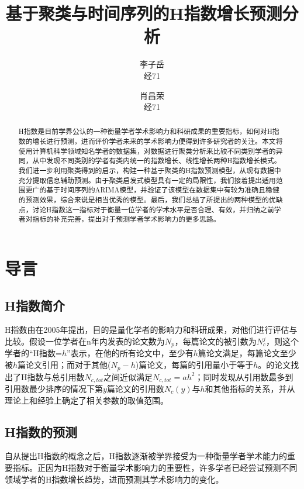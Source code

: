 \documentclass[lang=cn,11pt,a4paper,cite=authoryear]{elegantpaper}
\title{基于聚类与时间序列的H指数增长预测分析}
\author{李子岳 \\ 经71  \and 肖昌荣 \\ 经71}
\institute{清华大学经济管理学院}
\date{\zhtoday}
\begin{document}
\maketitle

\begin{abstract}
H指数是目前学界公认的一种衡量学者学术影响力和科研成果的重要指标，如何对H指数的增长进行预测，进而评价学者未来的学术影响力便得到许多研究者的关注。本文将使用计算机科学领域知名学者的数据集，对数据进行聚类分析来比较不同类别学者的异同，从中发现不同类别的学者有类内统一的指数增长、线性增长两种H指数增长模式。我们进一步利用聚类得到的启示，构建一种基于聚类的H指数预测模型，从现有数据中充分提取信息辅助预测。由于聚类启发式模型具有一定的局限性，我们接着提出适用范围更广的基于时间序列的ARIMA模型，并验证了该模型在数据集中有较为准确且稳健的预测效果，综合来说是相当优秀的模型。最后，我们总结了所提出的两种模型的优缺点，讨论H指数这一指标对于衡量一位学者的学术水平是否合理、有效，并归纳之前学者对指标的补充完善，提出对于预测学者学术影响力的更多思路。
\end{abstract}

\section{导言}

\subsection{H指数简介}

H指数由\cite{Hirsch16569}在2005年提出，目的是量化学者的影响力和科研成果，对他们进行评估与比较。假设一位学者在n年内发表的论文数为$N_p$，每篇论文的被引数为$N_c^j$，则这个学者的“H指数=$h$”表示，在他的所有论文中，至少有$h$篇论文满足，每篇论文至少被$h$篇论文引用；而对于其他($N_p-h$)篇论文，每篇的引用量小于等于$h$。\cite{Hirsch16569}的论文找出了H指数与总引用数$N_{c,tot}$之间近似满足$N_{c,tot}=ah^2$；同时发现从引用数最多到引用数最少排序的情况下第$y$篇论文的引用数$N_c (y)$与$h$和其他指标的关系，并从理论上和经验上确定了相关参数的取值范围。

\subsection{H指数的预测}

自从\cite{Hirsch16569}提出H指数的概念之后，H指数逐渐被学界接受为一种衡量学者学术能力的重要指标。正因为H指数对于衡量学术影响力的重要性，许多学者已经尝试预测不同领域学者的H指数增长趋势，进而预测其学术影响力的变化。
\end{document}
